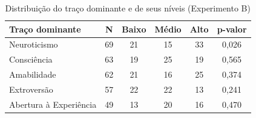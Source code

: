 \begin{table}[htb]
    \caption{Distribuição do traço dominante e de seus níveis (Experimento B)}
    \label{tab:aleat-exp-b}
    \centering
    \small
    \begin{tabular}{lccccc}
        \toprule
        Traço dominante & N & Baixo & Médio & Alto & p-valor \\
        \midrule
        Neuroticismo & 69 & 21 & 15 & 33 & 0,026 \\
        Consciência & 63 & 19 & 25 & 19 & 0,565 \\
        Amabilidade & 62 & 21 & 16 & 25 & 0,374 \\
        Extroversão & 57 & 22 & 22 & 13 & 0,241 \\
        Abertura à Experiência & 49 & 13 & 20 & 16 & 0,470 \\
        \bottomrule
    \end{tabular}
\end{table}
